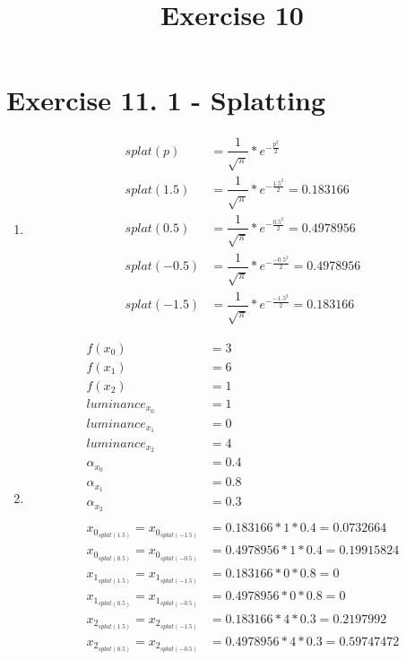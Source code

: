 \documentclass[a4paper]{article}
\date{}
\author{}
\title{Exercise 10}
\begin{document}
\maketitle 
\thispagestyle{fancy}


\section*{Exercise 11. 1 - Splatting}
\begin{enumerate}
	\item \begin{align*}
	splat(p) &= \dfrac{1}{\sqrt{\pi}} * e^{-\frac{p^2}{2}}\\
	splat(1.5) &= \dfrac{1}{\sqrt{\pi}} * e^{-\frac{1.5^2}{2}} = 0.183166\\
	splat(0.5) &= \dfrac{1}{\sqrt{\pi}} * e^{-\frac{0.5^2}{2}} = 0.4978956\\
	splat(-0.5) &= \dfrac{1}{\sqrt{\pi}} * e^{-\frac{-0.5^2}{2}} = 0.4978956\\
	splat(-1.5) &= \dfrac{1}{\sqrt{\pi}} * e^{-\frac{-1.5^2}{2}} = 0.183166
	\end{align*}
	\item \begin{align*}
		f(x_0) &= 3\\
		f(x_1) &= 6\\
		f(x_2) &= 1\\
		luminance_{x_0} &= 1\\
		luminance_{x_1} &= 0\\
		luminance_{x_2} &= 4\\
		\alpha_{x_0} &= 0.4\\
		\alpha_{x_1} &= 0.8\\
		\alpha_{x_2} &= 0.3\\
		\\
		x_{0_{splat(1.5)}} = x_{0_{splat(-1.5)}} &= 0.183166 * 1 * 0.4 = 0.0732664\\
		x_{0_{splat(0.5)}} = x_{0_{splat(-0.5)}} &= 0.4978956 * 1  * 0.4 = 0.19915824\\
		x_{1_{splat(1.5)}} = x_{1_{splat(-1.5)}} &= 0.183166 * 0 * 0.8 = 0\\
		x_{1_{splat(0.5)}} = x_{1_{splat(-0.5)}} &= 0.4978956 * 0 * 0.8 = 0\\
		x_{2_{splat(1.5)}} = x_{2_{splat(-1.5)}} &= 0.183166 * 4 * 0.3 = 0.2197992\\
		x_{2_{splat(0.5)}} = x_{2_{splat(-0.5)}} &= 0.4978956 * 4 * 0.3  = 0.59747472\\
	\end{align*}

\end{enumerate}
\end{document}
